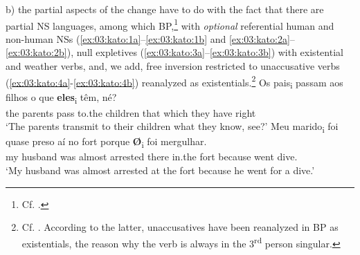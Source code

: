 \documentclass[output=paper,colorlinks,citecolor=brown]{langscibook}
\begin{document}
b) the partial aspects of the change have to do with the fact that there are partial NS languages, among which BP,\footnote{Cf.  \citet{holmberg_control_2010}.} with \emph{optional} referential human and non-human NSs (\ref{ex:03:kato:1a}--\ref{ex:03:kato:1b} and \ref{ex:03:kato:2a}--\ref{ex:03:kato:2b}), null expletives (\ref{ex:03:kato:3a}--\ref{ex:03:kato:3b}) with existential and weather verbs, and, we add, free inversion restricted to unaccusative verbs (\ref{ex:03:kato:4a}-\ref{ex:03:kato:4b}) reanalyzed as existentials.\footnote{Cf. \citet{kato_loss_1993, kato2000b, kato2002a}. According to the latter, unaccusatives have been reanalyzed in BP as existentials, the reason why the verb is always in the 3\textsuperscript{rd} person singular.}
\ea\label{ex:03:kato:1}
  \ea\label{ex:03:kato:1a}
 \gll Os pais\textsubscript{i}    passam aos     filhos     o que \textbf{eles}\textsubscript{i} têm, né?\\
          the parents pass      to.the children that  which  they have right\\
          \glt ‘The parents transmit to their children what they know, see?’
   \ex\label{ex:03:kato:1b}
 \gll Meu marido\textsubscript{i} foi  quase   preso     aí      no      fort porque \textbf{Ø}\textsubscript{i} foi    mergulhar.\\
          my   husband was almost arrested there in.the fort because  {}  went dive.\\
         \glt ‘My husband was almost arrested at the fort because he went for a dive.’
\end{document}
